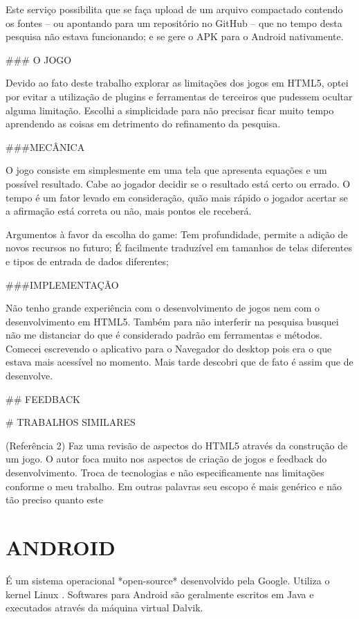 \documentclass[11pt,a4paper]{article}
\begin{document}
Este serviço possibilita que se faça upload de um arquivo compactado contendo os fontes – ou apontando para um repositório no GitHub – que no tempo desta pesquisa não estava funcionando; e se gere o APK para o Android nativamente.

### O JOGO

Devido ao fato deste trabalho explorar as limitações dos jogos em HTML5, optei por evitar a utilização de plugins e ferramentas de terceiros que pudessem ocultar alguma limitação.
Escolhi a simplicidade para não precisar ficar muito tempo aprendendo as coisas em detrimento do refinamento da pesquisa.

###MECÂNICA

O jogo consiste em simplesmente em uma tela que apresenta equações e um possível resultado. Cabe ao jogador decidir se o resultado está certo ou errado. O tempo é um fator levado em consideração, quão mais rápido o jogador acertar se a afirmação está correta ou não, mais pontos ele receberá.

Argumentos à favor da escolha do game:
Tem profundidade, permite a adição de novos recursos no futuro;
É facilmente traduzível em tamanhos de telas diferentes e tipos de entrada de dados diferentes;

###IMPLEMENTAÇÃO

Não tenho grande experiência com o desenvolvimento de jogos nem com o desenvolvimento em HTML5. Também para não interferir na pesquisa busquei não me distanciar do que é considerado padrão em ferramentas e métodos.
Comecei escrevendo o aplicativo para o Navegador do desktop pois era o que estava mais acessível no momento. Mais tarde descobri que de fato é assim que de desenvolve.

## FEEDBACK

# TRABALHOS SIMILARES

(Referência 2) Faz uma revisão de aspectos do HTML5 através da construção de um jogo. O autor foca muito nos aspectos de criação de jogos e feedback do desenvolvimento. Troca de tecnologias e não especificamente nas limitações conforme o meu trabalho. Em outras palavras seu escopo é mais genérico e não tão preciso quanto este

\section{ANDROID}

É um sistema operacional *open-source* desenvolvido pela Google. Utiliza o kernel Linux .
Softwares para Android são geralmente escritos em Java e executados através da máquina virtual Dalvik.
\end{document}
